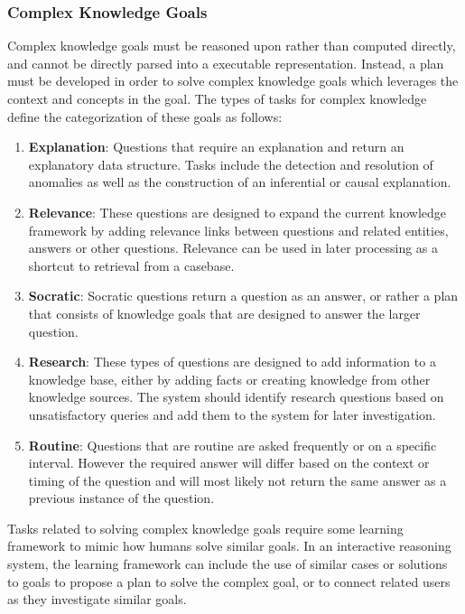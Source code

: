 \documentclass[11pt,letterpaper]{article}
\begin{document}
\subsubsection{Complex Knowledge Goals}

Complex knowledge goals must be reasoned upon rather than computed directly, and cannot be directly parsed into a executable representation. Instead, a plan must be developed in order to solve complex knowledge goals which leverages the context and concepts in the goal. The types of tasks for complex knowledge define the categorization of these goals as follows:

\begin{enumerate}

\item \textbf{Explanation}: Questions that require an explanation and return an explanatory data structure. Tasks include the detection and resolution of anomalies as well as the construction of an inferential or causal explanation.

\item \textbf{Relevance}: These questions are designed to expand the current knowledge framework by adding relevance links between questions and related entities, answers or other questions. Relevance can be used in later processing as a shortcut to retrieval from a casebase.

\item \textbf{Socratic}: Socratic questions return a question as an answer, or rather a plan that consists of knowledge goals that are designed to answer the larger question.

\item \textbf{Research}: These types of questions are designed to add information to a knowledge base, either by adding facts or creating knowledge from other knowledge sources. The system should identify research questions based on unsatisfactory queries and add them to the system for later investigation.

\item \textbf{Routine}: Questions that are routine are asked frequently or on a specific interval. However the required answer will differ based on the context or timing of the question and will most likely not return the same answer as a previous instance of the question.

\end{enumerate}

Tasks related to solving complex knowledge goals require some learning framework to mimic how humans solve similar goals. In an interactive reasoning system, the learning framework can include the use of similar cases or solutions to goals to propose a plan to solve the complex goal, or to connect related users as they investigate similar goals.
\end{document}
